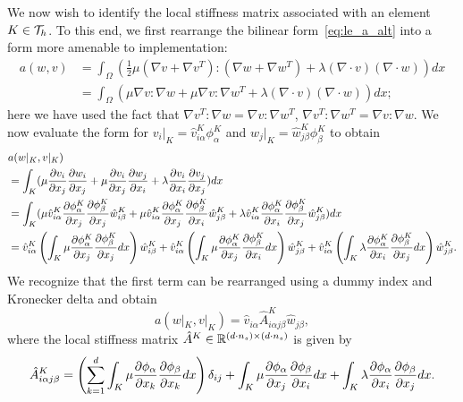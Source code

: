 We now wish to identify the local stiffness matrix associated with an element $K \in \mathcal{T}_h$.  To this end, we first rearrange the bilinear form~\eqref{eq:le_a_alt} into a form more amenable to implementation:
\begin{align*}
  a(w,v)
  &=
  \int_\Omega (\frac{1}{2} \mu (\nabla v + \nabla v^T) : (\nabla w + \nabla w^T) + \lambda (\nabla \cdot v) (\nabla \cdot w)) dx
  \\
  &=
  \int_\Omega ( \mu \nabla v :\nabla w + \mu \nabla v : \nabla w^T + \lambda (\nabla \cdot v) (\nabla \cdot w)) dx;
\end{align*}
here we have used the fact that $\nabla v^T : \nabla w = \nabla v : \nabla w^T$, $\nabla v^T: \nabla w^T = \nabla v : \nabla w$. We now evaluate the form for $v_i|_K = \hat v^K_{i\alpha} \phi^K_\alpha$ and $w_j|_K = \hat w^K_{j\beta} \phi^K_\beta$ to obtain
\begin{align*}
  &a(w|_K ,v|_K) \\
  &=
  \int_K ( \mu \frac{\partial v_i}{\partial x_j} \frac{\partial w_i}{\partial x_j}
  + \mu \frac{\partial v_i}{\partial x_j} \frac{\partial w_j}{\partial x_i}
  + \lambda \frac{\partial v_i}{\partial x_i} \frac{\partial v_j}{\partial x_j} ) dx 
  \\
  &=
  \int_K (
  \mu \hat v^K_{i\alpha} \frac{\partial \phi^K_\alpha}{\partial x_j} \frac{\partial \phi^K_\beta}{\partial x_j} \hat w^K_{i\beta}
  + \mu \hat v^K_{i\alpha} \frac{\partial \phi^K_\alpha}{\partial x_j} \frac{\partial \phi^K_\beta}{\partial x_i} \hat w^K_{j\beta}
  + \lambda \hat v^K_{i\alpha} \frac{\partial \phi^K_\alpha}{\partial x_i} \frac{\partial \phi^K_\beta}{\partial x_j} \hat w^K_{j\beta} ) dx
  \\
  &=
  \hat v^K_{i\alpha} \left( \int_K \mu \frac{\partial \phi^K_\alpha}{\partial x_j} \frac{\partial \phi^K_\beta}{\partial x_j} dx \right) \hat w^K_{i\beta}
  + \hat v^K_{i\alpha} \left( \int_K \mu \frac{\partial \phi^K_\alpha}{\partial x_j} \frac{\partial \phi^K_\beta}{\partial x_i} dx \right) \hat w^K_{j\beta}
  +\hat v^K_{i\alpha} \left( \int_K \lambda \frac{\partial \phi^K_\alpha}{\partial x_i} \frac{\partial \phi^K_\beta}{\partial x_j} dx  \right) \hat w^K_{j\beta}.
\end{align*}
We recognize that the first term can be rearranged using a dummy index and Kronecker delta and obtain
\begin{equation*}
  a(w|_K,v|_K) = \hat v_{i\alpha} \hat A^K_{i\alpha j\beta} \hat w_{j\beta},
\end{equation*}
where the local stiffness matrix $\hat A^K \in \mathbb{R}^{(d \cdot n_s) \times (d \cdot n_s)}$ is given by
\begin{equation*}
  \hat A^K_{i\alpha j\beta} = \left( \sum_{k=1}^d \int_K \mu \frac{\partial \phi_\alpha}{\partial x_k} \frac{\partial \phi_\beta}{\partial x_k} dx \right) \delta_{ij} +  \int_K \mu \frac{\partial \phi_\alpha}{\partial x_j} \frac{\partial \phi_\beta}{\partial x_i} dx + \int_K \lambda \frac{\partial \phi_\alpha}{\partial x_i} \frac{\partial \phi_\beta}{\partial x_j} dx.
\end{equation*}
